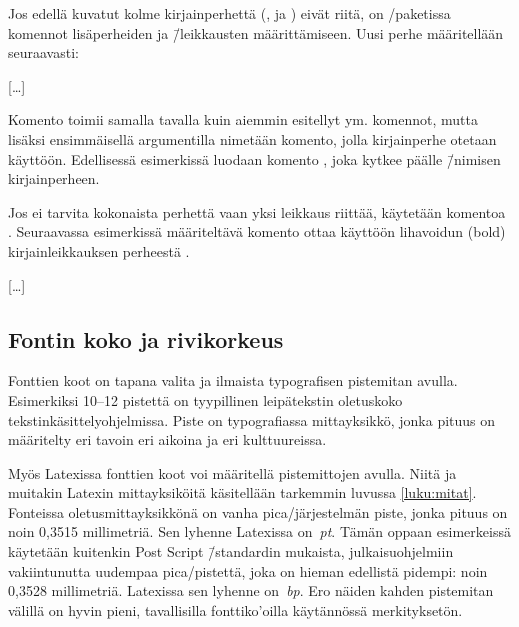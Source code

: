 Jos edellä kuvatut kolme kirjainperhettä (,
 ja ) eivät riitä, on
\-/paketissa komennot lisäperheiden ja \=/leikkausten
määrittämiseen. Uusi perhe määritellään seu\-raa\-vasti:

\begin{koodilohkosis}
[…]
\end{koodilohkosis}

Komento  toimii samalla tavalla kuin aiemmin
esitellyt  ym. komennot, mutta lisäksi
ensimmäisellä argumentilla nimetään komento, jolla kirjainperhe otetaan
käyttöön. Edellisessä esimerkissä luodaan komento
, joka kytkee päälle 
\=/nimisen kirjainperheen.

Jos ei tarvita kokonaista perhettä vaan yksi leikkaus riittää, käytetään
komentoa . Seuraavassa esimerkissä määriteltävä
komento  ottaa käyttöön lihavoidun (bold)
kirjainleikkauksen perheestä .

\begin{koodilohkosis}
[…]
\end{koodilohkosis}

\subsection{Fontin koko ja rivikorkeus}

Fonttien koot on tapana valita ja ilmaista typografisen pistemitan
avulla. Esimerkiksi 10--12 pistettä on tyypillinen leipätekstin
oletuskoko tekstinkäsittelyohjelmissa. Piste on typografiassa
mittayksikkö, jonka pituus on määritelty eri tavoin eri aikoina ja eri
kulttuureissa.

Myös Latexissa fonttien koot voi määritellä pistemittojen avulla. Niitä
ja muitakin Latexin mittayksiköitä käsitellään tarkemmin luvussa
\ref{luku:mitat}. Fonteissa oletusmittayksikkönä on vanha
pica\-/järjestelmän piste, jonka pituus on noin 0,3515 millimetriä. Sen
lyhenne Latexissa on~\emph{pt}. Tämän oppaan esimerkeissä käytetään
kuitenkin Post Script \=/standardin mukaista, julkaisuohjelmiin
vakiintunutta uudempaa pica\-/pistettä, joka on hieman edellistä
pidempi: noin 0,3528 millimetriä. Latexissa sen lyhenne on~\emph{bp}.
Ero näiden kahden pistemitan välillä on hyvin pieni, tavallisilla
fonttiko'oilla käytännössä merkityksetön.

